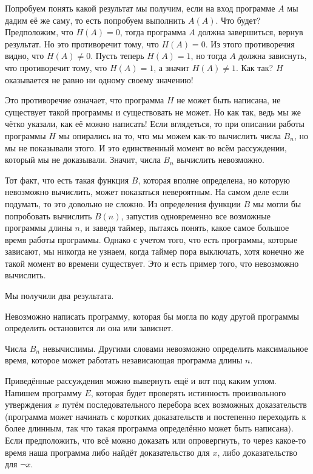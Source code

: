 Попробуем понять какой результат мы получим, если на вход программе $A$ мы дадим её же саму, то есть попробуем выполнить $A(A)$. Что будет? Предположим, что $H(A)=0$, тогда программа $A$ должна завершиться, вернув результат. Но это противоречит тому, что $H(A)=0$. Из этого противоречия видно, что $H(A)\not=0$. Пусть теперь $H(A)=1$, но тогда $A$ должна зависнуть, что противоречит тому, что $H(A)=1$, а значит $H(A)\not=1$. Как так? $H$ оказывается не равно ни одному своему значению!

Это противоречие означает, что программа $H$ не может быть написана, не существует такой программы и существовать не может. Но как так, ведь мы же чётко указали, как её можно написать! Если вглядеться, то при описании работы программы $H$ мы опирались на то, что мы можем как-то вычислить числа $B_n$, но мы не показывали этого. И это единственный момент во всём рассуждении, который мы не доказывали. Значит, числа $B_n$ вычислить невозможно.

Тот факт, что есть такая функция $B$, которая вполне определена, но которую невозможно вычислить, может показаться невероятным. На самом деле если подумать, то это довольно не сложно. Из определения функции $B$ мы могли бы попробовать вычислить $B(n)$, запустив одновременно все возможные программы длины $n$, и заведя таймер, пытаясь понять, какое самое большое время работы программы. Однако с учетом того, что есть программы, которые зависают, мы никогда не узнаем, когда таймер пора выключать, хотя конечно же такой момент во времени существует. Это и есть пример того, что  невозможно вычислить.

Мы получили два результата.

\begin{thm}
Невозможно написать программу, которая бы могла по коду другой программы определить остановится ли она или зависнет.
\end{thm}
\begin{thm}
Числа $B_n$ невычислимы. Другими словами невозможно определить максимальное время, которое может работать независающая программа длины $n$.
\end{thm}

Приведённые рассуждения можно вывернуть ещё и вот под каким углом. Напишем программу $E$, которая будет проверять истинность произвольного утверждения $x$ путём последовательного перебора всех возможных доказательств (программа может начинать с коротких доказательств и постепенно переходить к более длинным, так что такая программа определённо может быть написана). Если предположить, что всё можно доказать или опровергнуть, то через какое-то время наша программа либо найдёт доказательство для $x$, либо доказательство для $\neg x$.

